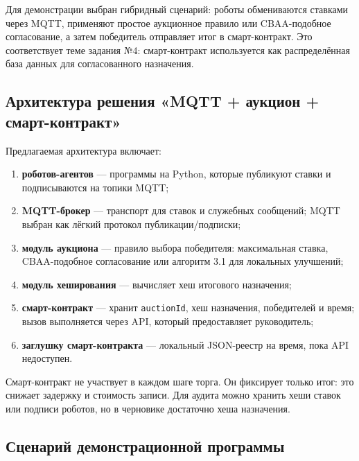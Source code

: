 \documentclass[14pt,a4paper]{extarticle}
\begin{document}
	Для демонстрации выбран гибридный сценарий: роботы обмениваются ставками через MQTT, применяют простое аукционное правило или CBAA-подобное согласование, а затем победитель отправляет итог в смарт-контракт. Это соответствует теме задания №4: смарт-контракт используется как распределённая база данных для согласованного назначения.
	
	\subsection{Архитектура решения «MQTT + аукцион + смарт-контракт»}
	
	Предлагаемая архитектура включает:
	\begin{enumerate}
		\item \textbf{роботов-агентов} — программы на Python, которые публикуют ставки и подписываются на топики MQTT;
		\item \textbf{MQTT-брокер} — транспорт для ставок и служебных сообщений; MQTT выбран как лёгкий протокол публикации/подписки;
		\item \textbf{модуль аукциона} — правило выбора победителя: максимальная ставка, CBAA-подобное согласование или алгоритм 3.1 для локальных улучшений;
		\item \textbf{модуль хеширования} — вычисляет хеш итогового назначения;
		\item \textbf{смарт-контракт} — хранит \texttt{auctionId}, хеш назначения, победителей и время; вызов выполняется через API, который предоставляет руководитель;
		\item \textbf{заглушку смарт-контракта} — локальный JSON-реестр на время, пока API недоступен.
	\end{enumerate}
	
	Смарт-контракт не участвует в каждом шаге торга. Он фиксирует только итог: это снижает задержку и стоимость записи. Для аудита можно хранить хеши ставок или подписи роботов, но в черновике достаточно хеша назначения.
	
	\subsection{Сценарий демонстрационной программы}
	
\end{document}
